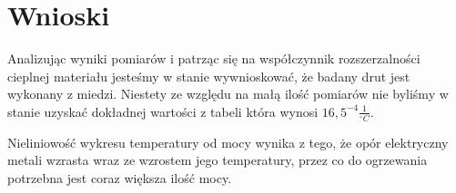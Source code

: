 \section{Wnioski}


Analizując wyniki pomiarów i patrząc się na współczynnik rozszerzalności cieplnej materiału jesteśmy w stanie wywnioskować, że badany drut jest wykonany z miedzi. Niestety ze względu na małą ilość pomiarów nie byliśmy w stanie uzyskać dokładnej wartości z tabeli która wynosi $16,5^{-4}\frac{1}{^\circ C}$.

Nieliniowość wykresu temperatury od mocy wynika z tego, że opór elektryczny metali wzrasta wraz ze wzrostem jego temperatury, przez co do ogrzewania potrzebna jest coraz większa ilość mocy.